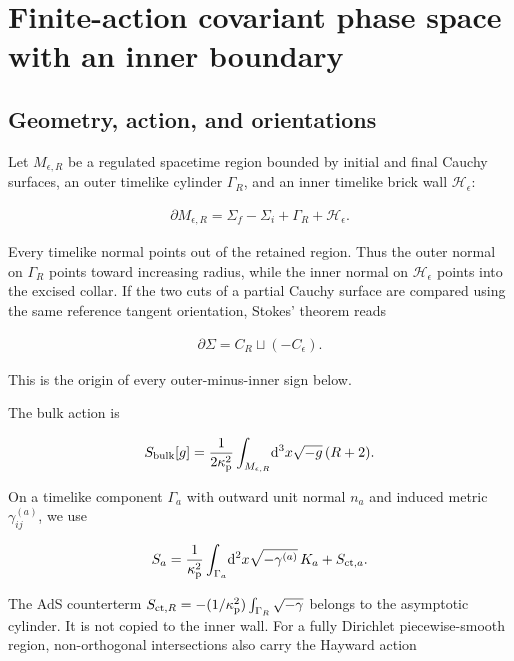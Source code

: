 \section{Finite-action covariant phase space with an inner boundary}\label{sec:finite-action-cps}

\subsection{Geometry, action, and orientations}\label{subsec:geometry-action}

Let $M_{\epsilon,R}$ be a regulated spacetime region bounded by initial and final Cauchy surfaces, an outer timelike cylinder $\Gamma_R$, and an inner timelike brick wall $\mathcal H_\epsilon$:

\begin{align}
\partial M_{\epsilon,R}
=\Sigma_f-\Sigma_i+\Gamma_R+\mathcal H_\epsilon .
\end{align}

Every timelike normal points out of the retained region. Thus the outer normal on $\Gamma_R$ points toward increasing radius, while the inner normal on $\mathcal H_\epsilon$ points into the excised collar. If the two cuts of a partial Cauchy surface are compared using the same reference tangent orientation, Stokes' theorem reads

\begin{align}
\partial\Sigma=C_R\sqcup(-C_\epsilon).
\end{align}

This is the origin of every outer-minus-inner sign below.

The bulk action is

\begin{align}
S_{\rm bulk}[g]
=\frac1{2\kappa_{\rm p}^{2}}
\int_{M_{\epsilon,R}}\!\mathrm d^3x\sqrt{-g}\,(R+2).
\end{align}

On a timelike component $\Gamma_a$ with outward unit normal $n_a$ and induced metric $\gamma^{(a)}_{ij}$, we use

\begin{align}
S_a
=\frac1{\kappa_{\rm p}^{2}}
\int_{\Gamma_a}\!\mathrm d^2x\sqrt{-\gamma^{(a)}}\,K_a
+S_{{\rm ct},a} .
\end{align}

The AdS counterterm $S_{{\rm ct},R}=-(1/\kappa_{\rm p}^{2})\int_{\Gamma_R}\sqrt{-\gamma}$ belongs to the asymptotic cylinder. It is not copied to the inner wall. For a fully Dirichlet piecewise-smooth region, non-orthogonal intersections also carry the Hayward action

